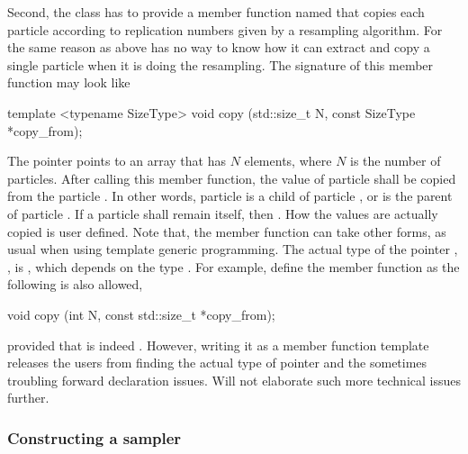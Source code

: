 Second, the class has to provide a member function named  that
copies each particle according to replication numbers given by a resampling
algorithm. For the same reason as above \vsmc has no way to know how it can
extract and copy a single particle when it is doing the resampling. The
signature of this member function may look like
\begin{cppcode}
template <typename SizeType>
void copy (std::size_t N, const SizeType *copy_from);
\end{cppcode}
The pointer  points to an array that has $N$ elements,
where $N$ is the number of particles. After calling this member function, the
value of particle  shall be copied from the particle
. In other words, particle  is a child of
particle , or  is the parent of particle
. If a particle  shall remain itself, then
. How the values are actually copied is user defined.
Note that, the member function can take other forms, as usual when using \cpp
template generic programming.
The actual type of the pointer , , is
, which depends on the type . For
example, define the member function as the following is also allowed,
\begin{cppcode}
void copy (int N, const std::size_t *copy_from);
\end{cppcode}
provided that  is indeed .
However, writing it as a member function template releases the users from
finding the actual type of pointer  and the sometimes
troubling forward declaration issues. Will not elaborate such more technical
issues further.

\subsubsection{Constructing a sampler}

